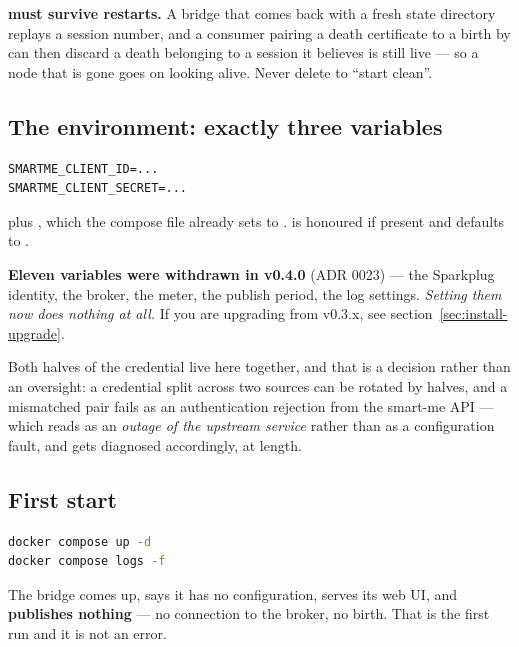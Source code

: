 \begin{warning}
\textbf{ must survive restarts.} A bridge that comes back with a
fresh state directory replays a session number, and a consumer pairing a death
certificate to a birth by  can then discard a death belonging to a
session it believes is still live --- so a node that is gone goes on looking alive.
Never delete  to ``start clean''.
\end{warning}

\subsection{The environment: exactly three variables}
\label{sec:install-env}

\begin{lstlisting}
SMARTME_CLIENT_ID=...
SMARTME_CLIENT_SECRET=...
\end{lstlisting}

plus , which the compose file already sets to .
 is honoured if present and defaults to .

\begin{note}
\textbf{Eleven variables were withdrawn in v0.4.0} (ADR 0023) --- the Sparkplug
identity, the broker, the meter, the publish period, the log settings. \emph{Setting
them now does nothing at all.} If you are upgrading from v0.3.x, see
section~\ref{sec:install-upgrade}.

Both halves of the credential live here together, and that is a decision rather than
an oversight: a credential split across two sources can be rotated by halves, and a
mismatched pair fails as an authentication rejection from the smart-me API --- which
reads as an \emph{outage of the upstream service} rather than as a configuration
fault, and gets diagnosed accordingly, at length.
\end{note}

\subsection{First start}

\begin{lstlisting}[language=bash]
docker compose up -d
docker compose logs -f
\end{lstlisting}

The bridge comes up, says it has no configuration, serves its web UI, and
\textbf{publishes nothing} --- no connection to the broker, no birth. That is the
first run and it is not an error.

